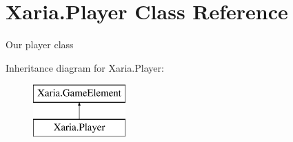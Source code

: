 \hypertarget{classXaria_1_1Player}{}\section{Xaria.\+Player Class Reference}
\label{classXaria_1_1Player}


Our player class  


Inheritance diagram for Xaria.\+Player\+:\begin{figure}[H]
\begin{center}
\leavevmode
\includegraphics[height=2.000000cm]{classXaria_1_1Player}
\end{center}
\end{figure}
